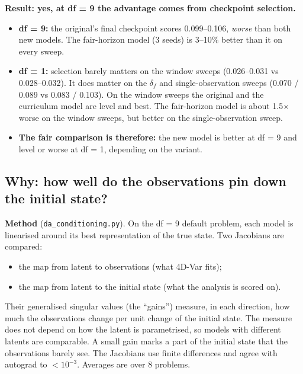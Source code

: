 \textbf{Result: yes, at df = 9 the advantage comes from checkpoint selection.}
\begin{itemize}
\item \textbf{df = 9:} the original's final checkpoint scores 0.099--0.106, \emph{worse} than
  both new models. The fair-horizon model (3 seeds) is 3--10\% better than it on every sweep.
\item \textbf{df = 1:} selection barely matters on the window sweeps (0.026--0.031 vs
  0.028--0.032). It does matter on the $\delta_f$ and single-observation sweeps (0.070 / 0.089
  vs 0.083 / 0.103). On the window sweeps the original and the curriculum model are level and
  best. The fair-horizon model is about
  1.5$\times$ worse on the window sweeps, but better on the single-observation sweep.
\item \textbf{The fair comparison is therefore:} the new model is better at df = 9 and
  level or worse at df = 1, depending on the variant.
\end{itemize}

\subsection{Why: how well do the observations pin down the initial state?}\label{sec:conditioning}

\textbf{Method} (\texttt{da\_conditioning.py}). On the df = 9 default problem, each model is
linearised around its best representation of the true state. Two Jacobians are compared:
\begin{itemize}
\item the map from latent to observations (what 4D-Var fits);
\item the map from latent to the initial state (what the analysis is scored on).
\end{itemize}
Their generalised singular values (the ``gains'') measure, in each direction, how much the
observations change per unit change of the initial state. The measure does not depend on how
the latent is parametrised, so models with different latents are comparable. A small gain
marks a part of the initial state that the observations barely see. The Jacobians use finite
differences and agree with autograd to $<10^{-3}$. Averages are over 8 problems.

